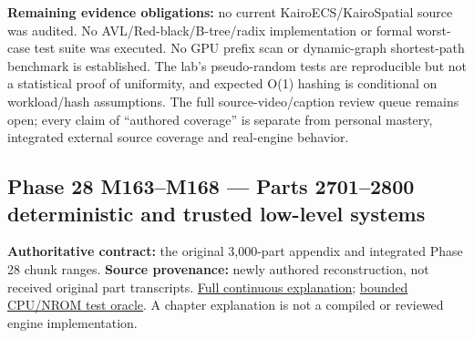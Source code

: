 \textbf{Remaining evidence obligations:} no current KairoECS/KairoSpatial source was audited. No AVL/Red-black/B-tree/radix implementation or formal worst-case test suite was executed. No GPU prefix scan or dynamic-graph shortest-path benchmark is established. The lab's pseudo-random tests are reproducible but not a statistical proof of uniformity, and expected O(1) hashing is conditional on workload/hash assumptions. The full source-video/caption review queue remains open; every claim of ``authored coverage'' is separate from personal mastery, integrated external source coverage and real-engine behavior.

\subsection{Phase 28 M163--M168 --- Parts 2701--2800 deterministic and trusted low-level systems}\label{appendix-fd090d982a15-phase-28-m163m168-parts-27012800-deterministic-and-trusted-low-level-systems}

\textbf{Authoritative contract:} the original 3,000-part appendix and integrated Phase 28 chunk ranges. \textbf{Source provenance:} newly authored reconstruction, not received original part transcripts. \href{Continuous\%20Notes/Computing\%20Foundations\%20-\%20From\%20Bits\%20to\%20C++\%20and\%20Systems\%20APIs}{Full continuous explanation}; \hyperref[source-file-552a9e2296dc984412c8f06d]{bounded CPU/NROM test oracle}. A chapter explanation is not a compiled or reviewed engine implementation.


